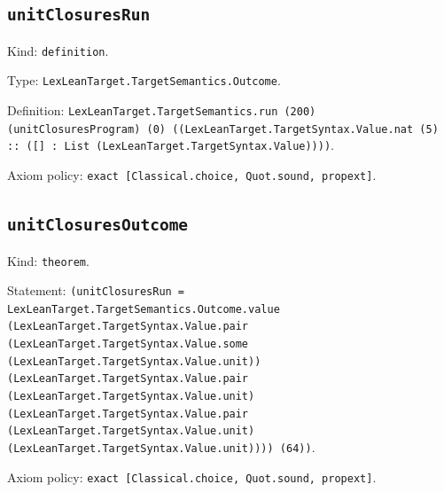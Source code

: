 \documentclass[11pt]{article}
\begin{document}
\subsection*{\texttt{unitClosuresRun}}
\noindent Kind: \texttt{definition}.\par
\noindent Type: \texttt{LexLeanTarget.TargetSemantics.Outcome}.\par
\noindent Definition: \texttt{LexLeanTarget.TargetSemantics.run (200) (unitClosuresProgram) (0) ((LexLeanTarget.TargetSyntax.Value.nat (5) :: ([] : List (LexLeanTarget.TargetSyntax.Value))))}.\par
\noindent Axiom policy: \texttt{exact [Classical.choice, Quot.sound, propext]}.\par
\subsection*{\texttt{unitClosuresOutcome}}
\noindent Kind: \texttt{theorem}.\par
\noindent Statement: \texttt{(unitClosuresRun = LexLeanTarget.TargetSemantics.Outcome.value (LexLeanTarget.TargetSyntax.Value.pair (LexLeanTarget.TargetSyntax.Value.some (LexLeanTarget.TargetSyntax.Value.unit)) (LexLeanTarget.TargetSyntax.Value.pair (LexLeanTarget.TargetSyntax.Value.unit) (LexLeanTarget.TargetSyntax.Value.pair (LexLeanTarget.TargetSyntax.Value.unit) (LexLeanTarget.TargetSyntax.Value.unit)))) (64))}.\par
\noindent Axiom policy: \texttt{exact [Classical.choice, Quot.sound, propext]}.\par
\end{document}
